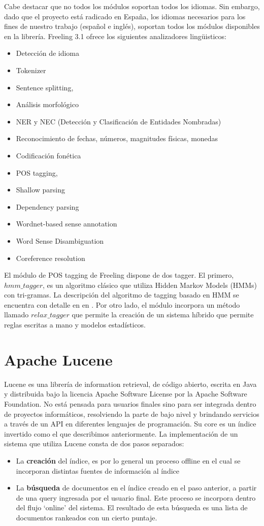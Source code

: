 Cabe destacar que no todos los m\'odulos soportan todos los idiomas. Sin embargo, dado que el proyecto está radicado en Espa\~na,
los idiomas necesarios para los fines de nuestro trabajo (espa\~nol e inglés), soportan todos los m\'odulos disponibles
en la librería.
Freeling 3.1 ofrece los siguientes analizadores lingüisticos:

\begin{itemize}
\item Detecci\'on de idioma
\item Tokenizer
\item Sentence splitting,
\item Análisis morfol\'ogico
\item NER y NEC (Detecci\'on y Clasificaci\'on de Entidades Nombradas)
\item Reconocimiento de fechas, números, magnitudes físicas, monedas
\item Codificaci\'on fonética
\item POS tagging,
\item Shallow parsing
\item Dependency parsing
\item Wordnet-based sense annotation
\item Word Sense Disambiguation
\item Coreference resolution
\end{itemize}


El módulo de POS tagging de Freeling dispone de dos tagger. El primero, $hmm\_tagger$, es un algoritmo clásico que utiliza Hidden Markov Models (HMMs) con tri-gramas. La descripción del algoritmo de tagging basado en HMM se encuentra con detalle en  en \cite{POS0}. Por otro lado, el módulo incorpora un método llamado $relax\_tagger$ que permite la creación de un sistema híbrido que permite reglas escritas a mano y modelos estadísticos.

\section{Apache Lucene}
\label{sec:lucene}
Lucene es una librería de information retrieval, de c\'odigo abierto, escrita en Java y distribuida
bajo la licencia Apache Software License por la Apache Software Foundation. No está pensada para
usuarios finales sino para ser integrada dentro de proyectos informáticos, resolviendo
la parte de bajo nivel y brindando servicios a través de un API en diferentes lenguajes de programaci\'on.
Su core es un índice invertido como el que describimos anteriormente. La implementaci\'on de un sistema
que utiliza Lucene consta de dos pasos separados:
\begin{itemize}
\item La \textbf{creaci\'on} del índice, es por lo general un proceso offline en el cual
se incorporan distintas fuentes de informaci\'on al índice
\item La \textbf{búsqueda} de documentos en el índice creado en el paso anterior, a partir de una query
ingresada por el usuario final. Este proceso se incorpora dentro del flujo `online' del sistema.
El resultado de esta búsqueda es una lista de documentos rankeados con un cierto puntaje.
\end{itemize}

